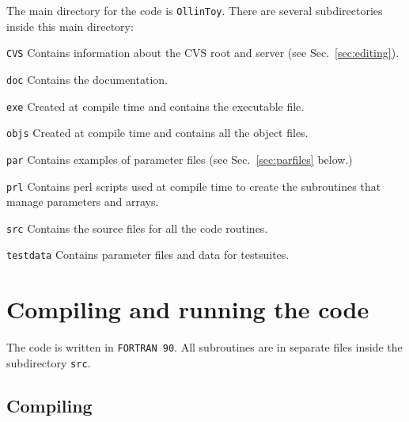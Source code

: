 \documentclass[12pt]{article}
\begin{document}
The main directory for the code is \texttt{OllinToy}.  There are several
subdirectories inside this main directory:

\begin{list}{}{
\setlength{\leftmargin}{35mm}
\setlength{\labelsep}{10mm}
\setlength{\labelwidth}{20mm}}

\item[\texttt{CVS}] Contains information about the CVS root and server (see
Sec.~\ref{sec:editing}).

\item[\texttt{doc}] Contains the documentation.

\item[\texttt{exe}] Created at compile time and contains the executable file.

\item[\texttt{objs}] Created at compile time and contains all the object files.

\item[\texttt{par}] Contains examples of parameter files (see
Sec.~\ref{sec:parfiles} below.)

\item[\texttt{prl}] Contains perl scripts used at compile time to create the
subroutines that manage parameters and arrays.

\item[\texttt{src}] Contains the source files for all the code routines.

\item[\texttt{testdata}] Contains parameter files and data for testsuites.

\end{list}



\pagebreak

\section{Compiling and running the code}

The code is written in \texttt{FORTRAN 90}.  All subroutines are in
separate files inside the subdirectory \texttt{src}.

\subsection{Compiling}
\label{sec:compiling}
\end{document}
